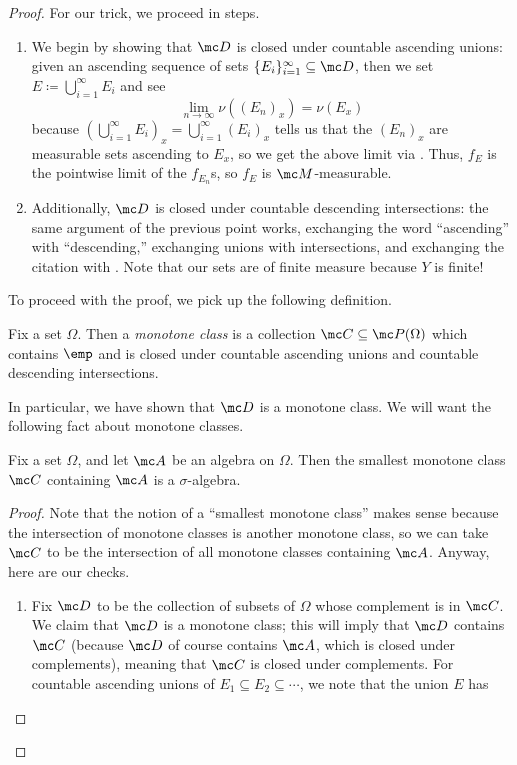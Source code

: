 \documentclass[../notes.tex]{subfiles}
\begin{document}
\begin{proof}
	For our trick, we proceed in steps.
	\begin{enumerate}
		\item We begin by showing that $\mc D$ is closed under countable ascending unions: given an ascending sequence of sets $\{E_i\}_{i=1}^\infty\subseteq\mc D$, then we set $E\coloneqq\bigcup_{i=1}^\infty E_i$ and see
		\[\lim_{n\to\infty}\nu((E_n)_x)=\nu(E_x)\]
		because $\left(\bigcup_{i=1}^\infty E_i\right)_x=\bigcup_{i=1}^\infty(E_i)_x$ tells us that the $(E_n)_x$ are measurable sets ascending to $E_x$, so we get the above limit via \cite[Proposition~6.36]{elber-top}. Thus, $f_E$ is the pointwise limit of the $f_{E_n}$s, so $f_E$ is $\mc M$-measurable.
		\item Additionally, $\mc D$ is closed under countable descending intersections: the same argument of the previous point works, exchanging the word ``ascending'' with ``descending,'' exchanging unions with intersections, and exchanging the citation with \cite[Corollary~6.37]{elber-top}. Note that our sets are of finite measure because $Y$ is finite!
	\end{enumerate}
	To proceed with the proof, we pick up the following definition.
	\begin{definition}
		Fix a set $\Omega$. Then a \textit{monotone class} is a collection $\mc C\subseteq\mc P(\Omega)$ which contains $\emp$ and is closed under countable ascending unions and countable descending intersections.
	\end{definition}
	In particular, we have shown that $\mc D$ is a monotone class. We will want the following fact about monotone classes.
	\begin{lemma} \label{lem:monotone-class-lemma}
		Fix a set $\Omega$, and let $\mc A$ be an algebra on $\Omega$. Then the smallest monotone class $\mc C$ containing $\mc A$ is a $\sigma$-algebra.
	\end{lemma}
	\begin{proof}
		Note that the notion of a ``smallest monotone class'' makes sense because the intersection of monotone classes is another monotone class, so we can take $\mc C$ to be the intersection of all monotone classes containing $\mc A$. Anyway, here are our checks.
		\begin{enumerate}
			\item Fix $\mc D$ to be the collection of subsets of $\Omega$ whose complement is in $\mc C$. We claim that $\mc D$ is a monotone class; this will imply that $\mc D$ contains $\mc C$ (because $\mc D$ of course contains $\mc A$, which is closed under complements), meaning that $\mc C$ is closed under complements. For countable ascending unions of $E_1\subseteq E_2\subseteq\cdots$, we note that the union $E$ has

\end{enumerate}
\end{proof}
\end{proof}
\end{document}
